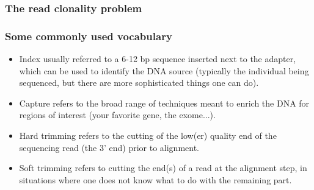 \documentclass{beamer}
\begin{document}
\begin{frame}
  \frametitle{The read clonality problem}
  \begin{center}
  \end{center}
\end{frame}


\begin{frame}
  \frametitle{Some commonly used vocabulary}
  \begin{itemize}
  \item Index usually referred to a 6-12 bp sequence inserted next to the adapter, which can be used to identify the DNA source (typically the individual being sequenced, but there are more sophisticated things one can do).
  \item Capture refers to the broad range of techniques meant to enrich the DNA for regions of interest (your favorite gene, the exome...).
  \item Hard trimming refers to the cutting of the low(er) quality end of the sequencing read (the 3' end) prior to alignment.
  \item Soft trimming refers to cutting the end(s) of a read at the alignment step, in situations where one does not know what to do with the remaining part.
  \end{itemize}
\end{frame}
\end{document}
